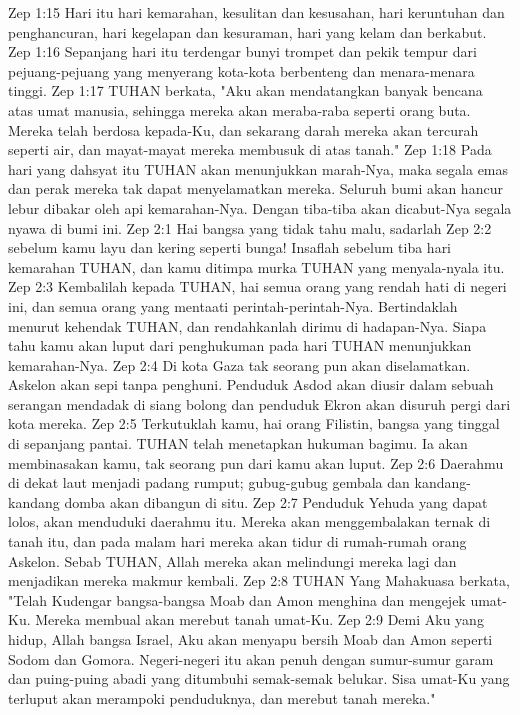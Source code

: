 Zep 1:15  Hari itu hari kemarahan, kesulitan dan kesusahan, hari keruntuhan dan penghancuran, hari kegelapan dan kesuraman, hari yang kelam dan berkabut.
Zep 1:16  Sepanjang hari itu terdengar bunyi trompet dan pekik tempur dari pejuang-pejuang yang menyerang kota-kota berbenteng dan menara-menara tinggi.
Zep 1:17  TUHAN berkata, "Aku akan mendatangkan banyak bencana atas umat manusia, sehingga mereka akan meraba-raba seperti orang buta. Mereka telah berdosa kepada-Ku, dan sekarang darah mereka akan tercurah seperti air, dan mayat-mayat mereka membusuk di atas tanah."
Zep 1:18  Pada hari yang dahsyat itu TUHAN akan menunjukkan marah-Nya, maka segala emas dan perak mereka tak dapat menyelamatkan mereka. Seluruh bumi akan hancur lebur dibakar oleh api kemarahan-Nya. Dengan tiba-tiba akan dicabut-Nya segala nyawa di bumi ini.
Zep 2:1  Hai bangsa yang tidak tahu malu, sadarlah
Zep 2:2  sebelum kamu layu dan kering seperti bunga! Insaflah sebelum tiba hari kemarahan TUHAN, dan kamu ditimpa murka TUHAN yang menyala-nyala itu.
Zep 2:3  Kembalilah kepada TUHAN, hai semua orang yang rendah hati di negeri ini, dan semua orang yang mentaati perintah-perintah-Nya. Bertindaklah menurut kehendak TUHAN, dan rendahkanlah dirimu di hadapan-Nya. Siapa tahu kamu akan luput dari penghukuman pada hari TUHAN menunjukkan kemarahan-Nya.
Zep 2:4  Di kota Gaza tak seorang pun akan diselamatkan. Askelon akan sepi tanpa penghuni. Penduduk Asdod akan diusir dalam sebuah serangan mendadak di siang bolong dan penduduk Ekron akan disuruh pergi dari kota mereka.
Zep 2:5  Terkutuklah kamu, hai orang Filistin, bangsa yang tinggal di sepanjang pantai. TUHAN telah menetapkan hukuman bagimu. Ia akan membinasakan kamu, tak seorang pun dari kamu akan luput.
Zep 2:6  Daerahmu di dekat laut menjadi padang rumput; gubug-gubug gembala dan kandang-kandang domba akan dibangun di situ.
Zep 2:7  Penduduk Yehuda yang dapat lolos, akan menduduki daerahmu itu. Mereka akan menggembalakan ternak di tanah itu, dan pada malam hari mereka akan tidur di rumah-rumah orang Askelon. Sebab TUHAN, Allah mereka akan melindungi mereka lagi dan menjadikan mereka makmur kembali.
Zep 2:8  TUHAN Yang Mahakuasa berkata, "Telah Kudengar bangsa-bangsa Moab dan Amon menghina dan mengejek umat-Ku. Mereka membual akan merebut tanah umat-Ku.
Zep 2:9  Demi Aku yang hidup, Allah bangsa Israel, Aku akan menyapu bersih Moab dan Amon seperti Sodom dan Gomora. Negeri-negeri itu akan penuh dengan sumur-sumur garam dan puing-puing abadi yang ditumbuhi semak-semak belukar. Sisa umat-Ku yang terluput akan merampoki penduduknya, dan merebut tanah mereka."
